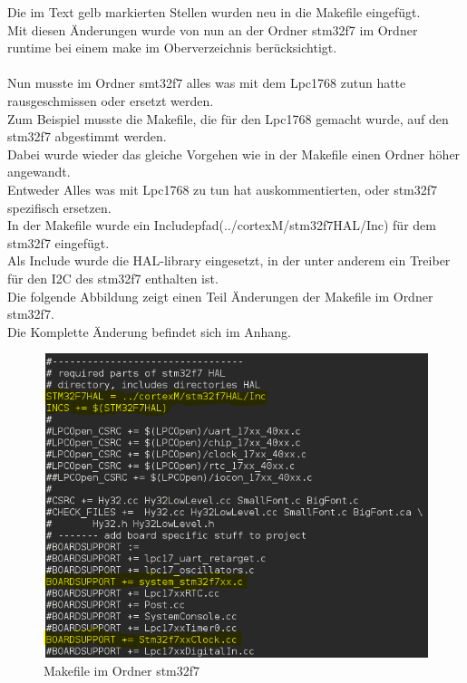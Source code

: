 \newpage
\noindent
Die im Text gelb markierten Stellen wurden neu in die Makefile eingefügt.\\
Mit diesen Änderungen wurde von nun an der Ordner stm32f7 im Ordner runtime bei einem make im Oberverzeichnis berücksichtigt.\\
\\
Nun musste im Ordner smt32f7 alles was mit dem Lpc1768 zutun hatte rausgeschmissen oder ersetzt werden.\\
Zum Beispiel musste die Makefile, die für den Lpc1768 gemacht wurde, auf den stm32f7 abgestimmt werden.\\
Dabei wurde wieder das gleiche Vorgehen wie in der Makefile einen Ordner höher angewandt.\\
Entweder Alles was mit Lpc1768 zu tun hat auskommentierten, oder stm32f7 spezifisch ersetzen.\\
In der Makefile wurde ein Includepfad(../cortexM/stm32f7HAL/Inc) für dem stm32f7 eingefügt.\\
Als Include wurde die HAL-library eingesetzt, in der unter anderem ein Treiber für den I2C des stm32f7 enthalten ist.\\ 
Die folgende Abbildung zeigt einen Teil Änderungen der Makefile im Ordner stm32f7.\\
Die Komplette Änderung befindet sich im Anhang.\newpage
\begin{figure}[h]
\begin{center}
\includegraphics[width=13cm]{grafiken/Makefile_stm32f7_1.png}
\caption{Makefile im Ordner stm32f7}
\label{Makefile_stm32f7}
\end{center}
\end{figure}
